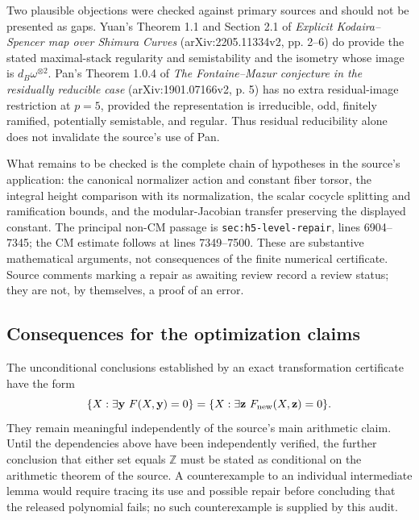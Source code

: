 Two plausible objections were checked against primary sources and
should not be presented as gaps.  Yuan's Theorem 1.1 and Section 2.1
of \emph{Explicit Kodaira--Spencer map over Shimura Curves}
(arXiv:2205.11334v2, pp. 2--6) do provide the stated maximal-stack
regularity and semistability and the isometry whose image is
$d_B\omega^{\otimes2}$.  Pan's Theorem 1.0.4 of
\emph{The Fontaine--Mazur conjecture in the residually reducible case}
(arXiv:1901.07166v2, p. 5) has no extra residual-image restriction
at $p=5$, provided the representation is irreducible, odd, finitely
ramified, potentially semistable, and regular.  Thus residual
reducibility alone does not invalidate the source's use of Pan.

What remains to be checked is the complete chain of hypotheses in the
source's application: the canonical normalizer action and constant
fiber torsor, the integral height comparison with its normalization,
the scalar cocycle splitting and ramification bounds, and the
modular-Jacobian transfer preserving the displayed constant.
The principal non-CM passage is
\texttt{sec:h5-level-repair}, lines 6904--7345; the CM estimate follows
at lines 7349--7500.  These are substantive mathematical arguments,
not consequences of the finite numerical certificate.  Source comments
marking a repair as awaiting review record a review status; they are
not, by themselves, a proof of an error.

\subsection{Consequences for the optimization claims}

The unconditional conclusions established by an exact transformation
certificate have the form
\[
 \{X:\exists\mathbf y\ F(X,\mathbf y)=0\}
 =\{X:\exists\mathbf z\ F_{\rm new}(X,\mathbf z)=0\}.
\]
They remain meaningful independently of the source's main arithmetic
claim.  Until the dependencies above have been independently verified,
the further conclusion that either set equals $\mathbb Z$ must be
stated as conditional on the arithmetic theorem of the source.
A counterexample to an individual intermediate lemma would require
tracing its use and possible repair before concluding that the released
polynomial fails; no such counterexample is supplied by this audit.
